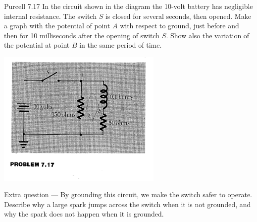 \documentclass[makesolutionspdf]{esg8022pset}
\begin{document}
\begin{problem}{Purcell 7.17}
  In the circuit shown in the diagram the 10-volt battery has negligible
  internal resistance.  The switch $S$ is closed for several seconds, then
  opened.  Make a graph with the potential of point $A$ with respect to
  ground, just before and then for 10 milliseconds after the opening of
  switch $S$.  Show also the variation of the potential at point $B$ in the
  same period of time.
  
  \begin{center}
    \includegraphics[width = 0.6\textwidth]{figpu717}
  \end{center}

  Extra question --- By grounding this circuit, we make the switch
  safer to operate. Describe why a large spark jumps across the switch
  when it is not grounded, and why the spark does not happen when it is
  grounded.
\end{problem}
\end{document}
